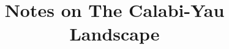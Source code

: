 \documentclass[12pt]{article}
\begin{document}
    \title{Notes on The Calabi-Yau Landscape}
\end{document}
